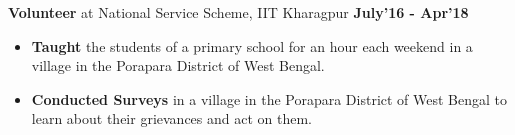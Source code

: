 \documentclass[10pt]{article}
\begin{document}
\fi
\large { \textbf{Volunteer} at National Service Scheme, IIT Kharagpur} \normalsize
{\hfill} \textbf{July'16 - Apr'18}\\[-1.8em]
\begin{itemize}
    \item \textbf{Taught} the students of a primary school for an hour each weekend in a village in the Porapara District of West Bengal. \\[-2em]
    \item \textbf{Conducted Surveys} in a village in the Porapara District of West Bengal to learn about their grievances and act on them. \\[-2em]
\end{itemize}
\iffalse
\fi
\end{document}
